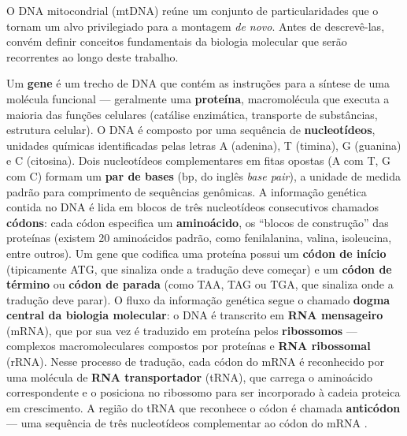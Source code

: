 O DNA mitocondrial (mtDNA) reúne um conjunto de particularidades que o tornam um alvo privilegiado para a montagem \textit{de novo}. Antes de descrevê-las, convém definir conceitos fundamentais da biologia molecular que serão recorrentes ao longo deste trabalho.

Um \textbf{gene} é um trecho de DNA que contém as instruções para a síntese de uma molécula funcional --- geralmente uma \textbf{proteína}, macromolécula que executa a maioria das funções celulares (catálise enzimática, transporte de substâncias, estrutura celular). O DNA é composto por uma sequência de \textbf{nucleotídeos}, unidades químicas identificadas pelas letras A (adenina), T (timina), G (guanina) e C (citosina). Dois nucleotídeos complementares em fitas opostas (A com T, G com C) formam um \textbf{par de bases} (bp, do inglês \textit{base pair}), a unidade de medida padrão para comprimento de sequências genômicas. A informação genética contida no DNA é lida em blocos de três nucleotídeos consecutivos chamados \textbf{códons}: cada códon especifica um \textbf{aminoácido}, os ``blocos de construção'' das proteínas (existem 20 aminoácidos padrão, como fenilalanina, valina, isoleucina, entre outros). Um gene que codifica uma proteína possui um \textbf{códon de início} (tipicamente ATG, que sinaliza onde a tradução deve começar) e um \textbf{códon de término} ou \textbf{códon de parada} (como TAA, TAG ou TGA, que sinaliza onde a tradução deve parar). O fluxo da informação genética segue o chamado \textbf{dogma central da biologia molecular}: o DNA é transcrito em \textbf{RNA mensageiro} (mRNA), que por sua vez é traduzido em proteína pelos \textbf{ribossomos} --- complexos macromoleculares compostos por proteínas e \textbf{RNA ribossomal} (rRNA). Nesse processo de tradução, cada códon do mRNA é reconhecido por uma molécula de \textbf{RNA transportador} (tRNA), que carrega o aminoácido correspondente e o posiciona no ribossomo para ser incorporado à cadeia proteica em crescimento. A região do tRNA que reconhece o códon é chamada \textbf{anticódon} --- uma sequência de três nucleotídeos complementar ao códon do mRNA \cite{alberts2022}.

